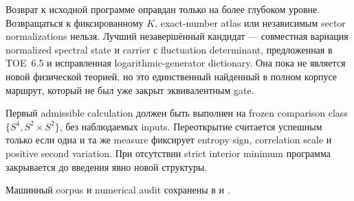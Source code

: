 \begin{theorem}
Возврат к исходной программе оправдан только на более глубоком уровне.
Возвращаться к фиксированному \(K\), exact-number atlas или независимым
sector normalizations нельзя. Лучший незавершённый кандидат --- совместная
вариация normalized spectral state и carrier с fluctuation determinant,
предложенная в TOE~6.5 и исправленная logarithmic-generator dictionary.
Она пока не является новой физической теорией, но это единственный найденный
в полном корпусе маршрут, который не был уже закрыт эквивалентным gate.
\end{theorem}

Первый admissible calculation должен быть выполнен на frozen comparison
class \(\{S^4,S^2\times S^2\}\), без наблюдаемых inputs. Переоткрытие
считается успешным только если одна и та же measure фиксирует entropy sign,
correlation scale и positive second variation. При отсутствии strict
interior minimum программа закрывается до введения явно новой структуры.

Машинный corpus и numerical audit сохранены в
 и
.